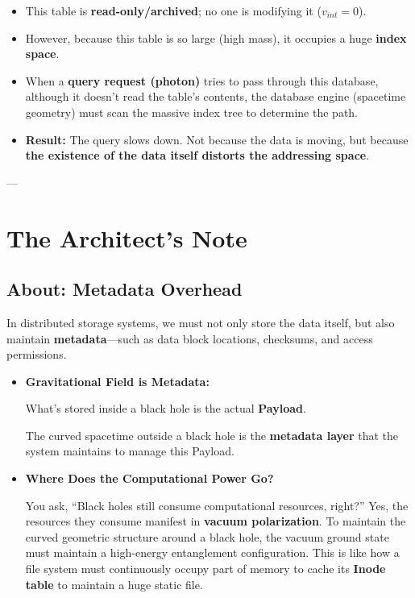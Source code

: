 \documentclass[11pt,a4paper,twoside]{book}
\begin{document}
\begin{itemize}
\item This table is \textbf{read-only/archived}; no one is modifying it (\textbf{$v_{int}=0$}).

\item However, because this table is so large (high mass), it occupies a huge \textbf{index space}.

\item When a \textbf{query request (photon)} tries to pass through this database, although it doesn't read the table's contents, the database engine (spacetime geometry) must scan the massive index tree to determine the path.

\item \textbf{Result:} The query slows down. Not because the data is moving, but because \textbf{the existence of the data itself distorts the addressing space}.
\end{itemize}

---

\section{The Architect's Note}

\subsection{About: Metadata Overhead}

In distributed storage systems, we must not only store the data itself, but also maintain \textbf{metadata}---such as data block locations, checksums, and access permissions.

\begin{itemize}
\item \textbf{Gravitational Field is Metadata:}

    What's stored inside a black hole is the actual \textbf{Payload}.

    The curved spacetime outside a black hole is the \textbf{metadata layer} that the system maintains to manage this Payload.

\item \textbf{Where Does the Computational Power Go?}

    You ask, ``Black holes still consume computational resources, right?'' Yes, the resources they consume manifest in \textbf{vacuum polarization}. To maintain the curved geometric structure around a black hole, the vacuum ground state must maintain a high-energy entanglement configuration. This is like how a file system must continuously occupy part of memory to cache its \textbf{Inode table} to maintain a huge static file.
\end{itemize}
\end{document}
